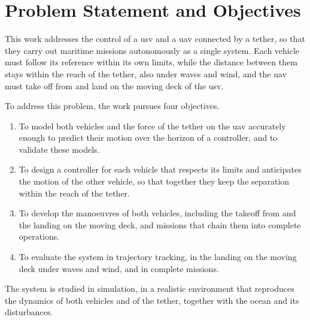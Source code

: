 
\section{Problem Statement and Objectives}
\label{sec:intro_problem_statement}

This work addresses the control of a \gls{usv} and a \gls{uav} connected by a tether, so that they carry out maritime missions autonomously as a single system. Each vehicle must follow its reference within its own limits, while the distance between them stays within the reach of the tether, also under waves and wind, and the \gls{uav} must take off from and land on the moving deck of the \gls{usv}.

To address this problem, the work pursues four objectives.
\begin{enumerate}
    \item To model both vehicles and the force of the tether on the \gls{uav} accurately enough to predict their motion over the horizon of a controller, and to validate these models.
    \item To design a controller for each vehicle that respects its limits and anticipates the motion of the other vehicle, so that together they keep the separation within the reach of the tether.
    \item To develop the manoeuvres of both vehicles, including the takeoff from and the landing on the moving deck, and missions that chain them into complete operations.
    \item To evaluate the system in trajectory tracking, in the landing on the moving deck under waves and wind, and in complete missions.
\end{enumerate}

The system is studied in simulation, in a realistic environment that reproduces the dynamics of both vehicles and of the tether, together with the ocean and its disturbances.
